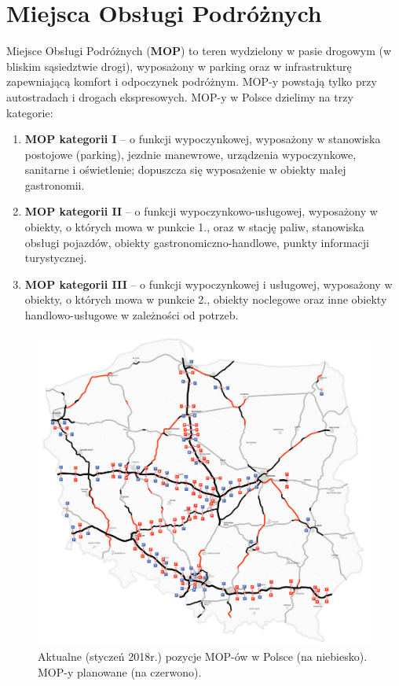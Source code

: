 \section{Miejsca Obsługi Podróżnych}
Miejsce Obsługi Podróżnych (\textbf{MOP}) to teren wydzielony w pasie drogowym (w bliskim sąsiedztwie drogi), wyposażony w parking oraz w infrastrukturę zapewniającą komfort i odpoczynek podróżnym\cite{gddkia-mop}. MOP-y powstają tylko przy autostradach i drogach ekspresowych.\newline
MOP-y w Polsce dzielimy na trzy kategorie:
\begin{enumerate}
    \item \textbf{MOP kategorii I} -- o funkcji wypoczynkowej, wyposażony w stanowiska postojowe (parking), jezdnie manewrowe, urządzenia wypoczynkowe, sanitarne i oświetlenie; dopuszcza się wyposażenie w obiekty małej gastronomii.
    \item \textbf{MOP kategorii II} -- o funkcji wypoczynkowo-usługowej, wyposażony w obiekty, o których mowa
w punkcie 1., oraz w stację paliw, stanowiska obsługi pojazdów, obiekty gastronomiczno-handlowe, punkty informacji turystycznej.
    \item \textbf{MOP kategorii III} -- o funkcji wypoczynkowej i usługowej, wyposażony w obiekty, o których mowa w punkcie 2., obiekty noclegowe oraz inne obiekty handlowo-usługowe w zależności od potrzeb.
\end{enumerate}
\begin{figure}[h]
\caption{Aktualne (styczeń 2018r.) pozycje MOP-ów w Polsce (na niebiesko). MOP-y planowane (na czerwono).}
\includegraphics[width=\textwidth]{images/mopymap.png}
\end{figure}

